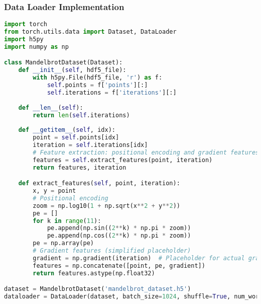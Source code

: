 \documentclass[journal]{IEEEaccess}
\begin{document}
\subsubsection{Data Loader Implementation}
\begin{lstlisting}[language=Python, caption=PyTorch DataLoader Implementation]
import torch
from torch.utils.data import Dataset, DataLoader
import h5py
import numpy as np

class MandelbrotDataset(Dataset):
    def __init__(self, hdf5_file):
        with h5py.File(hdf5_file, 'r') as f:
            self.points = f['points'][:]
            self.iterations = f['iterations'][:]
    
    def __len__(self):
        return len(self.iterations)
    
    def __getitem__(self, idx):
        point = self.points[idx]
        iteration = self.iterations[idx]
        # Feature extraction: positional encoding and gradient features
        features = self.extract_features(point, iteration)
        return features, iteration

    def extract_features(self, point, iteration):
        x, y = point
        # Positional encoding
        zoom = np.log10(1 + np.sqrt(x**2 + y**2))
        pe = []
        for k in range(11):
            pe.append(np.sin((2**k) * np.pi * zoom))
            pe.append(np.cos((2**k) * np.pi * zoom))
        pe = np.array(pe)
        # Gradient features (simplified placeholder)
        gradient = np.gradient(iteration)  # Placeholder for actual gradient computation
        features = np.concatenate([point, pe, gradient])
        return features.astype(np.float32)

dataset = MandelbrotDataset('mandelbrot_dataset.h5')
dataloader = DataLoader(dataset, batch_size=1024, shuffle=True, num_workers=8)
\end{lstlisting}
\end{document}
